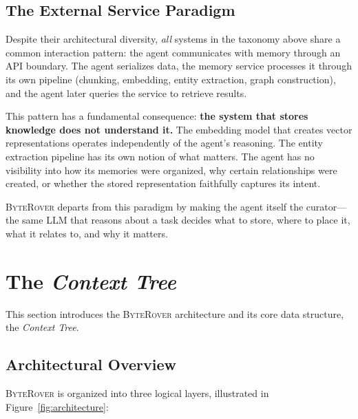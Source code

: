 \documentclass[11pt]{article}
\newcommand{\byterover}{\textsc{ByteRover}}
\newcommand{\contexttree}{\textit{Context Tree}}
\begin{document}
\subsection{The External Service Paradigm}
\label{sec:external-service}

Despite their architectural diversity, \emph{all} systems in the taxonomy above
share a common interaction pattern: the agent communicates with memory through an API boundary.
The agent serializes data, the memory service processes it through its own pipeline
(chunking, embedding, entity extraction, graph construction),
and the agent later queries the service to retrieve results.

This pattern has a fundamental consequence:
\textbf{the system that stores knowledge does not understand it.}
The embedding model that creates vector representations operates independently of the agent's reasoning.
The entity extraction pipeline has its own notion of what matters.
The agent has no visibility into how its memories were organized, why certain relationships were created,
or whether the stored representation faithfully captures its intent.

\byterover{} departs from this paradigm by making the agent itself the curator---the
same LLM that reasons about a task decides what to store, where to place it,
what it relates to, and why it matters.


\section{The \contexttree{}}
\label{sec:design}

This section introduces the \byterover{} architecture and its core data structure, the \contexttree{}.

\subsection{Architectural Overview}
\label{sec:arch-overview}

\byterover{} is organized into three logical layers,
illustrated in Figure~\ref{fig:architecture}:
\end{document}

